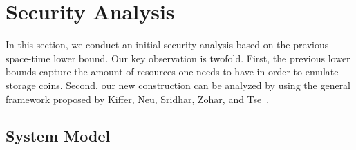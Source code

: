 \documentclass[conference]{IEEEtran}
\begin{document}









\section{Security Analysis}

In this section, we conduct an initial security analysis based on the previous space-time lower bound.
Our key observation is twofold. First, the previous lower bounds capture the amount of resources one needs 
to have in order to emulate storage coins. Second, our new construction can be analyzed
by using the general framework proposed by Kiffer, Neu, Sridhar, Zohar, and Tse~\cite{blockchain_capacity}.

\subsection{System Model}
\end{document}
